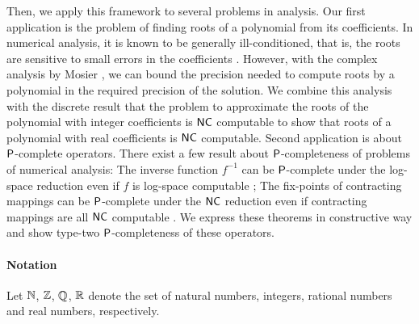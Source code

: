 \documentclass{article}
\theoremstyle{definition}
\theoremstyle{remark}
\begin{document}
Then, we apply this framework to several problems in analysis.
Our first application is the problem of finding roots of a polynomial 
from its coefficients.
In numerical analysis, it is known to be generally ill-conditioned, 
that is, the roots are sensitive to 
small errors in the coefficients \cite{wilkinson1963rounding}.
However, with the complex analysis by Mosier \cite{mosier1986root},
we can bound the precision needed to compute
roots by a polynomial in the required precision of the solution.
We combine this analysis with the discrete result 
that the problem to approximate the roots of the polynomial with integer 
coefficients is $\mathsf{NC}$ computable \cite{neff1994specified}
to show that roots of a polynomial with real coefficients
is $\mathsf{NC}$ computable.
Second application is about $\mathsf{P}$-complete operators.
There exist a few result about $\mathsf{P}$-completeness of problems of numerical analysis:
The inverse function $f^{-1}$ can be $\mathsf{P}$-complete under the log-space
reduction even if $f$ is log-space computable \cite{ko1983computational};
The fix-points of contracting mappings can be $\mathsf{P}$-complete under the
$\mathsf{NC}$ reduction even if contracting mappings are all $\mathsf{NC}$ computable \cite{hoover1991real}.
We express these theorems in constructive way and
show type-two $\mathsf{P}$-completeness of these operators.






\paragraph{Notation}
Let $\mathbb N$, $\mathbb Z$, $\mathbb Q$, $\mathbb R$ denote the set of natural numbers,
integers,
rational numbers and 
real numbers, respectively.
\end{document}
